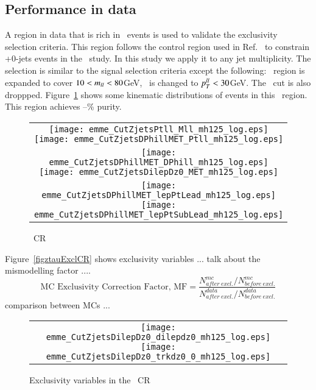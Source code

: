 \subsection{Performance in data}
\par A region in data that is rich in \Ztau\ events is used to validate the exclusivity selection 
criteria. This region follows the control region used in Ref.~\cite{ATLASCONF2014060} to constrain 
 \Ztau+0-jets events in the \HWW\ study. In this study we apply it to any jet multiplicity.
The selection is similar to the signal selection criteria except the following: \mll\ region is expanded to 
cover $10<m_{ll}<80 $GeV, \ptll\ is changed to $p_{T}^{ll}<30 $GeV. The \dfll\ cut is also droppped. Figure~\ref{fig:ztauCR}
shows some kinematic distributions of events in this \Ztau\ region. This region achieves 
--\% purity. 

\begin{figure}[!h]
\centering
\begin{tabular}{c}
	\texttt{[image: emme\_CutZjetsPtll\_Mll\_mh125\_log.eps]}
	\texttt{[image: emme\_CutZjetsDPhillMET\_Ptll\_mh125\_log.eps]}\\
	\texttt{[image: emme\_CutZjetsDPhillMET\_DPhill\_mh125\_log.eps]}
	\texttt{[image: emme\_CutZjetsDilepDz0\_MET\_mh125\_log.eps]}\\
	\texttt{[image: emme\_CutZjetsDPhillMET\_lepPtLead\_mh125\_log.eps]}
	\texttt{[image: emme\_CutZjetsDPhillMET\_lepPtSubLead\_mh125\_log.eps]}\\
\end{tabular}
\caption{\Ztau\ CR}
\label{fig:ztauCR}
\end{figure}

\par Figure~\ref{figztauExclCR} shows exclusivity variables ... 
talk about the mismodelling factor .... 
\begin{equation}
\mbox{MC Exclusivity Correction Factor, MF} = \frac{N^{mc}_{after\ excl.}/N^{mc}_{before\ excl.}}{N^{data}_{after\ excl.}/N^{data}_{before\ excl.}}
\end{equation}
comparison between MCs ...
 
\begin{figure}[!h]
\centering
\begin{tabular}{c}
	\texttt{[image: emme\_CutZjetsDilepDz0\_dilepdz0\_mh125\_log.eps]}
	\texttt{[image: emme\_CutZjetsDilepDz0\_trkdz0\_0\_mh125\_log.eps]}\\
\end{tabular}
\caption{Exclusivity variables in the \Ztau\ CR}
\label{fig:ztauExclCR}
\end{figure}

